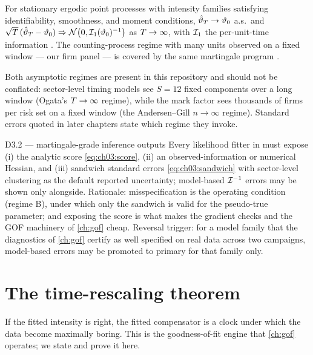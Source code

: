 \begin{theorem}\label{thm:ch03:mle}
For stationary ergodic point processes with intensity families satisfying
identifiability, smoothness, and moment conditions,
$\hat{\vartheta}_{T} \to \vartheta_0$ a.s.\ and
$\sqrt{T}\,(\hat{\vartheta}_{T} - \vartheta_0) \Rightarrow
\mathcal N\big(0, \mathcal{I}_1(\vartheta_0)^{-1}\big)$ as
$T \to \infty$, with $\mathcal{I}_1$ the per-unit-time information
\citep{ogata1978}. The counting-process regime with many units observed on
a fixed window --- our firm panel --- is covered by the same martingale
program \citep{andersengill1982,abgk1993}.
\end{theorem}

Both asymptotic regimes are present in this repository and should not be
conflated: sector-level timing models see $S = 12$ fixed components over a
long window (Ogata's $T\to\infty$ regime), while the mark factor sees
thousands of firms per risk set on a fixed window (the Andersen--Gill
$n\to\infty$ regime). Standard errors quoted in later chapters state which
regime they invoke.

\begin{decision}{D3.2 --- martingale-grade inference outputs}
Every likelihood fitter in \modrepo{} must expose (i) the analytic score
\cref{eq:ch03:score}, (ii) an observed-information or numerical Hessian,
and (iii) sandwich standard errors \cref{eq:ch03:sandwich} with
sector-level clustering as the default reported uncertainty; model-based
$\mathcal{I}^{-1}$ errors may be shown only alongside. Rationale:
misspecification is the operating condition (regime B), under which only
the sandwich is valid for the pseudo-true parameter; and exposing the
score is what makes the gradient checks and the GOF machinery of
\cref{ch:gof} cheap. Reversal trigger: for a model family that the
diagnostics of \cref{ch:gof} certify as well specified on real data across
two campaigns, model-based errors may be promoted to primary for that
family only.
\end{decision}

\section{The time-rescaling theorem}\label{ch03:sec:rescaling}

If the fitted intensity is right, the fitted compensator is a clock under
which the data become maximally boring. This is the goodness-of-fit engine
that \cref{ch:gof} operates; we state and prove it here.

